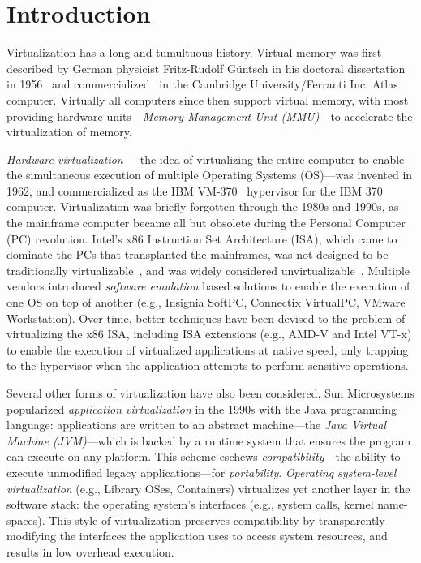 \section{Introduction}
\label{sec:intro}

Virtualization has a long and tumultuous history. Virtual memory was first
described by German physicist Fritz-Rudolf Güntsch in his doctoral
dissertation in 1956~\cite{virtual-memory} and commercialized~\cite{atlas-vm}
in the Cambridge University/Ferranti Inc. Atlas computer. Virtually all
computers since then support virtual memory, with most providing hardware
units---\emph{Memory Management Unit (MMU)}---to accelerate the virtualization
of memory.

\emph{Hardware virtualization}~\cite{cp40}---the idea of virtualizing the
entire computer to enable the simultaneous execution of multiple Operating
Systems (OS)---was invented in 1962, and commercialized as the IBM
VM-370~\cite{vm370} hypervisor for the IBM 370 computer.
Virtualization was briefly forgotten through the 1980s and 1990s, as the
mainframe computer became all but obsolete during the Personal Computer (PC)
revolution. Intel's x86 Instruction Set Architecture (ISA), which came to
dominate the PCs that transplanted the mainframes, was not designed to be
traditionally virtualizable~\cite{popek-goldberg}, and was widely considered
unvirtualizable~. Multiple vendors
introduced \emph{software emulation} based solutions to enable the execution
of one OS on top of another (e.g., Insignia SoftPC, Connectix VirtualPC,
VMware Workstation). Over time, better techniques have been devised to the
problem of virtualizing the x86 ISA, including ISA extensions
(e.g., AMD-V and Intel VT-x) to enable the execution of virtualized
applications at native speed, only trapping to the hypervisor when
the application attempts to perform sensitive operations.

Several other forms of virtualization have also been considered.
Sun Microsystems popularized \emph{application virtualization} in the 1990s
with the Java programming language: applications are written to an abstract
machine---the \emph{Java Virtual Machine (JVM)}---which is backed by a runtime
system that ensures the program can execute on any platform.
This scheme eschews \emph{compatibility}---the ability to execute unmodified
legacy applications---for \emph{portability}.
\emph{Operating system-level virtualization} (e.g., Library OSes, Containers)
virtualizes yet another layer in the software stack: the operating system's
interfaces (e.g., system calls, kernel name-spaces). This style of
virtualization preserves compatibility by transparently modifying the
interfaces the application uses to access system resources, and results in
low overhead execution.

